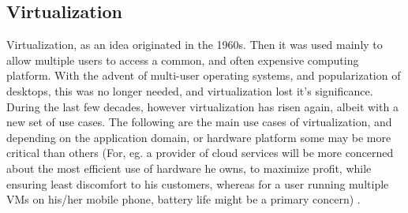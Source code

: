 \documentclass[seminar,twoside]{iitbreport}
\begin{document}
\subsection{Virtualization}
Virtualization, as an idea originated in the 1960s. Then it was used mainly to allow multiple users to access a common, and often expensive computing platform.
With the advent of multi-user operating systems, and popularization of desktops, this was no longer needed, and virtualization lost it's significance.
During the last few decades, however virtualization has risen again, albeit with a new set of use cases.
The following are the main use cases of virtualization, and depending on the application domain, or hardware platform some may be more critical than others (For, eg. a provider of cloud services will
be more concerned about the most efficient use of hardware he owns, to maximize profit, while ensuring least discomfort to his customers, whereas for a user running multiple VMs on his/her mobile phone, battery life might
be a primary concern) .
\end{document}
